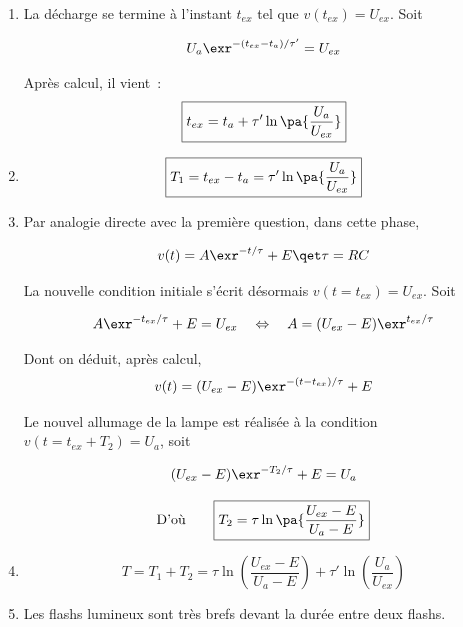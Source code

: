 \documentclass[a4paper, 10pt, garamond, oneside]{book}
\begin{document}
{\begin{enumerate}
		      En négligeant les termes en $r/R$ : $0 = rC \dv{v}{t}+ v$

		      La solution s'écrit :
		      \[
			      v(t) = A \exr^{-t/\tau'} \qet \tau' = rC
		      \]
		      En exploitant la nouvelle condition initiale
		      $v(t=t_{a}) = U_{a}$, il vient
		      \[
			      A\exr^{-t_{a}/\tau'} =
			      U_{a} \qsoit  A =
			      U_{a}\exr^{t_{a}/\tau'}
		      \]
		      Ainsi,
		      \[
			      \boxed{v(t) = U_{a} \exr^{-(t-t_{a})/\tau'}}
		      \]
		\item
		      La décharge se termine à l'instant $t_{ex}$ tel que
		      $v(t_{ex}) = U_{ex}$. Soit

		      \[
			      U_{a} \exr^{-(t_{ex}-t_{a})/\tau'} = U_{ex}
		      \]

		      Après calcul, il vient~:
		      \[
			      \boxed{t_{ex} = t_{a}+ \tau' \ln\pa{\frac{U_{a}}{U_{ex}}}}
		      \]

		\item
		      \[
			      \boxed{
			      T_1 =
			      t_{ex}-t_{a} =
			      \tau' \ln\pa{\frac{U_{a}}{U_{ex}}}}
		      \]

		\item
		      Par analogie directe avec la première question, dans cette phase,


		      \[
			      v(t) = A \exr^{-t/\tau} +E \qet \tau = RC
		      \]



		      \noindent
		      La nouvelle condition initiale s'écrit désormais $v(t=t_{ex}) = U_{ex}$. Soit


		      \[
			      A \exr^{-t_{ex}/\tau} + E = U_{ex} \quad \Leftrightarrow \quad A = (U_{ex}-E) \exr^{t_{ex}/\tau}
		      \]


		      Dont on déduit, après calcul,
		      \[
			      v(t) = (U_{ex}-E)\exr^{-(t-t_{ex})/\tau} + E
		      \]

		      Le nouvel allumage de la lampe est réalisée à la condition $v(t = t_{ex} + T_2) = U_{a}$, soit

		      \[
			      (U_{ex}-E)\exr^{-T_2/\tau} + E = U_{a}
		      \]


		      \[
			      \text{D'où}\qquad
			      \boxed{T_2 = \tau \ln\pa{\frac{U_{ex}-E}{U_{a}-E}}}
		      \]

		\item
		      \[
			      T = T_1+T_2 =
			      \tau \ln\left(\frac{U_{ex}-E}{U_{a}-E}\right) +
			      \tau' \ln(\frac{U_{a}}{U_{ex}})
		      \]
		\item Les flashs lumineux sont très brefs devant la durée entre deux flashs.
	\end{enumerate}
}
\end{document}
